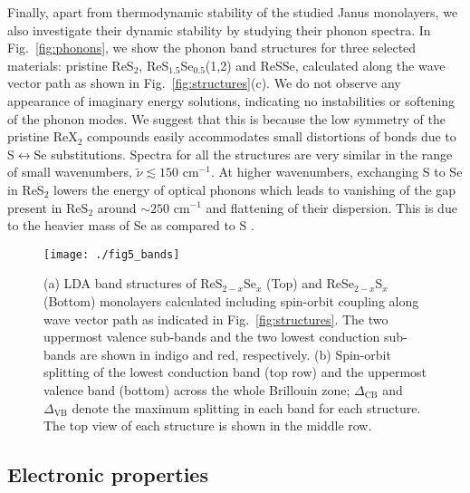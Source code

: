 \documentclass[reprint, superscriptaddress, amsmath,amssymb,prb,twocolumn]{revtex4-2}
\def\SSex{ReS$_{2-x}$Se$_x$}
\def\SeSx{ReSe$_{2-x}$S$_x$}
\begin{document}
Finally, apart from thermodynamic stability of the studied Janus monolayers, we also investigate their dynamic stability by studying their phonon spectra. In Fig.~\ref{fig:phonons}, we show the phonon band structures for three selected materials: pristine ReS$_{2}$, ReS$_{1.5}$Se$_{0.5}$(1,2) and ReSSe, calculated along the wave vector path as shown in Fig.~\ref{fig:structures}(c). We do not observe any appearance of imaginary energy solutions, indicating no instabilities or softening of the phonon modes. We suggest that this is because the low symmetry of the pristine ReX$_{2}$ compounds easily accommodates small distortions of bonds due to S$\leftrightarrow$Se substitutions. Spectra for all the structures are very similar in the range of small wavenumbers, $\tilde{\nu}\lesssim 150$ cm$^{-1}$. At higher wavenumbers, exchanging S to Se in ReS$_{2}$ lowers the energy of optical phonons which leads to vanishing of the gap present in ReS$_{2}$ around $\sim 250$ cm$^{-1}$ and flattening of their dispersion. This is due to the heavier mass of Se as compared to S \cite{hart_npj2d_2017}.


\begin{figure*}[!t]
\begin{center}
\texttt{[image: ./fig5\_bands]}
\caption{(a) LDA band structures of \SSex{} (Top) and \SeSx{} (Bottom) monolayers calculated including spin-orbit coupling along wave vector path as indicated in Fig.~\ref{fig:structures}. The two uppermost valence sub-bands and the two lowest conduction sub-bands are shown in indigo and red, respectively. (b) Spin-orbit splitting of the lowest conduction band (top row) and the uppermost valence band (bottom) across the whole Brillouin zone; $\Delta_{\mathrm{CB}}$ and $\Delta_{\mathrm{VB}}$ denote the maximum splitting in each band for each structure. The top view of each structure is shown in the middle row.}
\label{fig:bands}
\end{center}
\end{figure*}

\subsection{Electronic properties} \label{sec:elec_prop}
\end{document}
